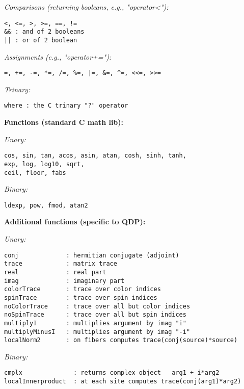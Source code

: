 \documentclass[12pt,letterpaper]{article}
\begin{document}
\noindent
{\em Comparisons (returning booleans, e.g., "operator<"):}

\begin{verbatim}
<, <=, >, >=, ==, !=
&& : and of 2 booleans
|| : or of 2 boolean
\end{verbatim}


\noindent
{\em Assignments (e.g., "operator+="):}

\begin{verbatim}
=, +=, -=, *=, /=, %=, |=, &=, ^=, <<=, >>=
\end{verbatim}

\noindent
{\em Trinary:}

\begin{verbatim}
where : the C trinary "?" operator
\end{verbatim}

\medskip


\noindent
{\bf\large Functions (standard C math lib):}

\noindent
{\em Unary:}

\begin{verbatim}
cos, sin, tan, acos, asin, atan, cosh, sinh, tanh,
exp, log, log10, sqrt,
ceil, floor, fabs
\end{verbatim}

\noindent
{\em Binary:}

\begin{verbatim}
ldexp, pow, fmod, atan2
\end{verbatim}

\medskip


\noindent
{\bf\large Additional functions (specific to QDP):}

\noindent
{\em Unary:}

\begin{verbatim}
conj             : hermitian conjugate (adjoint)
trace            : matrix trace
real             : real part
imag             : imaginary part
colorTrace       : trace over color indices
spinTrace        : trace over spin indices
noColorTrace     : trace over all but color indices
noSpinTrace      : trace over all but spin indices
multiplyI        : multiplies argument by imag "i"
multiplyMinusI   : multiplies argument by imag "-i"
localNorm2       : on fibers computes trace(conj(source)*source)
\end{verbatim}


\noindent
{\em Binary:}

\begin{verbatim}
cmplx              : returns complex object   arg1 + i*arg2
localInnerproduct  : at each site computes trace(conj(arg1)*arg2)
\end{verbatim}
\end{document}
